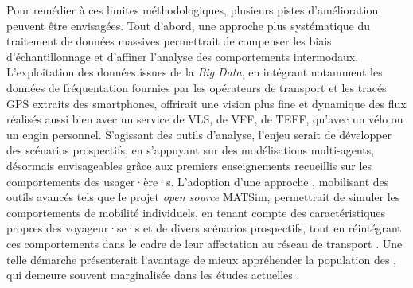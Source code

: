 \begin{refsegment}
Pour remédier à ces limites méthodologiques, plusieurs pistes d’amélioration peuvent être envisagées. Tout d’abord, une approche plus systématique du traitement de données massives permettrait de compenser les biais d’échantillonnage et d’affiner l’analyse des comportements intermodaux. L’exploitation des données issues de la \textsl{Big Data}, en intégrant notamment les données de fréquentation fournies par les opérateurs de transport et les tracés \acrshort{GPS} extraits des smartphones, offrirait une vision plus fine et dynamique des flux réalisés aussi bien avec un service de \acrshort{VLS}, de \acrshort{VFF}, de \acrshort{TEFF}, qu'avec un vélo ou un engin personnel. S'agissant des outils d'analyse, l’enjeu serait de développer des scénarios prospectifs, en s’appuyant sur des modélisations multi-agents, désormais envisageables grâce aux premiers enseignements recueillis sur les comportements  des usager·ère·s. L’adoption d’une approche , mobilisant des outils avancés tels que le projet \textsl{open source} \acrfull{MATSim}, permettrait de simuler les comportements de mobilité individuels, en tenant compte des caractéristiques propres des voyageur·se·s et de divers scénarios prospectifs, tout en réintégrant ces comportements dans le cadre de leur affectation au réseau de transport \textcolor{blue}{\autocite[119]{chapelon_transports_2016}}. Une telle démarche présenterait l’avantage de mieux appréhender la population des , qui demeure souvent marginalisée dans les études actuelles \textcolor{blue}{\autocite{poisson_amenagements_2019}}.%
    

\end{refsegment}
